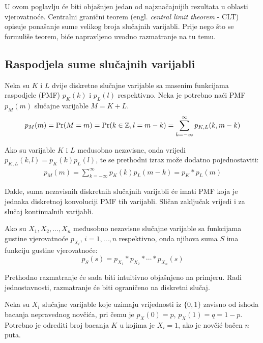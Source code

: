 U ovom poglavlju će biti objašnjen jedan od najznačajnijih rezultata u oblasti
vjerovatnoće. Centralni granični teorem (engl.  \textit{central limit theorem} -
CLT) opisuje ponašanje sume velikog broja slučajnih varijabli. Prije nego što se
formuliše teorem, biće napravljeno uvodno razmatranje na tu temu.

\subsection{Raspodjela sume slučajnih varijabli} \label{sec:clt-suma}

Neka su $K$ i $L$ dvije diskretne slučajne varijable sa masenim funkcijama
raspodjele (PMF) $p_K(k)$ i $p_L(l)$ respektivno. Neka je potrebno naći PMF
$p_M(m)$ slučajne varijable $M=K+L$.
%
\begin{align*}
  p_M(m) = \mathrm{Pr}(M=m) = \mathrm{Pr}(k\in\mathbb{Z}, l=m-k)
  = \sum_{k=-\infty}^{\infty} p_{K,L}(k,m-k)
\end{align*}

Ako su varijable $K$ i $L$ međusobno nezavisne, onda vrijedi $p_{K,L}(k,l) =
p_K(k)p_L(l)$, te se prethodni izraz može dodatno pojednostaviti:
%
\begin{align*}
  p_M(m) = \sum_{k=-\infty}^{\infty} p_K(k)p_L(m-k) = p_K * p_L (m)
\end{align*}

Dakle, suma nezavisnih diskretnih slučajnih varijabli će imati PMF koja je
jednaka diskretnoj konvoluciji PMF tih varijabli. Sličan zaključak vrijedi i za
slučaj kontinualnih varijabli.

\begin{theorem}

  Ako su $X_1,X_2,...,X_n$ međusobno nezavisne slučajne varijable sa funkcijama
  gustine vjerovatnoće $p_{X_i}$, $i=1,...,n$ respektivno, onda njihova suma $S$
  ima funkciju gustine vjerovatnoće:
  $$p_S(s) = p_{X_1} * p_{X_2} * \cdots * p_{X_n} (s)$$

\end{theorem}

Prethodno razmatranje će sada biti intuitivno objašnjeno na primjeru.  Radi
jednostavnosti, razmatranje će biti ograničeno na diskretni slučaj.

\begin{exmp} \label{ex:novcic}
  
Neka su $X_i$ slučajne varijable koje uzimaju vrijednosti iz $\{0,1\}$ zavisno
od ishoda bacanja nepravednog novčića, pri čemu je $p_X(0)= p$, $p_X(1)=q=1-p$.
Potrebno je odrediti broj bacanja $K$ u kojima je $X_i=1$, ako je novčić bačen
$n$ puta.

\end{exmp}

